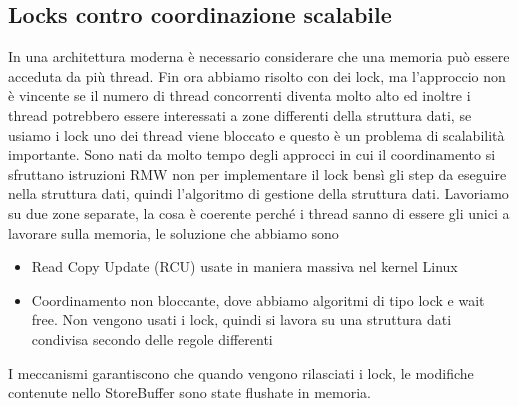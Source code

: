 \documentclass[12pt, oneside]{extbook}
\begin{document}
\subsection{Locks contro coordinazione scalabile} 
In una architettura moderna è necessario considerare che una memoria può essere acceduta da più thread. Fin ora abbiamo risolto con dei lock, ma l'approccio non è vincente se il numero di thread concorrenti diventa molto alto ed inoltre i thread potrebbero essere interessati a zone differenti della struttura dati, se usiamo i lock uno dei thread viene bloccato e questo è un problema di scalabilità importante. Sono nati da molto tempo degli approcci in cui il coordinamento si sfruttano istruzioni RMW non per implementare il lock bensì gli step da eseguire nella struttura dati, quindi l'algoritmo di gestione della struttura dati. Lavoriamo su due zone separate, la cosa è coerente perché i thread sanno di essere gli unici a lavorare sulla memoria, le soluzione che abbiamo sono
\begin{itemize}
\item Read Copy Update (RCU) usate in maniera massiva nel kernel Linux
\item Coordinamento non bloccante, dove abbiamo algoritmi di tipo lock e wait free. Non vengono usati i lock, quindi si lavora su una struttura dati condivisa secondo delle regole differenti
\end{itemize}
I meccanismi garantiscono che quando vengono rilasciati i lock, le modifiche contenute nello StoreBuffer sono state flushate in memoria.
\end{document}
